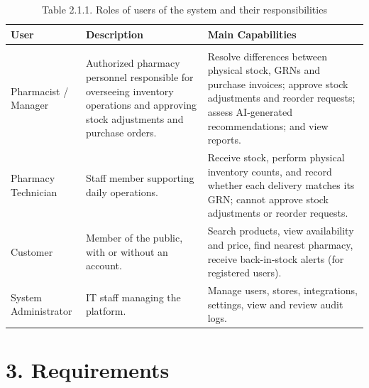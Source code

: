 {\def\LTcaptype{none} %
\begin{longtable}[]{|
  >{\raggedright\arraybackslash}m{}|
  >{\raggedright\arraybackslash}m{}|
  >{\raggedright\arraybackslash}m{}|}
\hline
\begin{minipage}[c]{\linewidth}\raggedright
\textbf{User}
\end{minipage} & \begin{minipage}[c]{\linewidth}\raggedright
\textbf{Description}
\end{minipage} & \begin{minipage}[c]{\linewidth}\raggedright
\textbf{Main Capabilities}
\end{minipage} \\
\hline
\endhead

\caption*{Table 2.1.1. Roles of users of the system and their responsibilities}\\
\endlastfoot
Pharmacist / Manager & Authorized pharmacy personnel responsible for overseeing inventory operations and approving stock adjustments and purchase orders. & Resolve differences between physical stock, GRNs and purchase invoices; approve stock adjustments and reorder requests; assess AI-generated recommendations; and view reports. \\ \hline
Pharmacy Technician & Staff member supporting daily operations. & Receive stock, perform physical inventory counts, and record whether each delivery matches its GRN; cannot approve stock adjustments or reorder requests. \\ \hline
Customer & Member of the public, with or without an account. & Search products, view availability and price, find nearest pharmacy, receive back-in-stock alerts (for registered users). \\ \hline
System Administrator & IT staff managing the platform. & Manage users, stores, integrations, settings, view and review audit logs. \\ \hline
\end{longtable}
}

\clearpage
\section{3. Requirements}\label{requirements}

